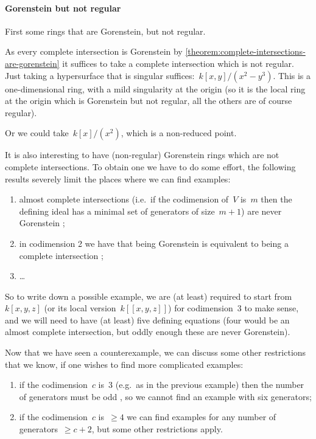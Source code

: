 \documentclass[10pt,a4paper]{article}
\begin{document}
\paragraph{Gorenstein but not regular}
First some rings that are Gorenstein, but not regular.
\begin{example}
  As every complete intersection is Gorenstein by \cref{theorem:complete-intersections-are-gorenstein} it suffices to take a complete intersection which is not regular. Just taking a hypersurface that is singular suffices:~$k[x,y]/(x^2-y^3)$. This is a one-dimensional ring, with a mild singularity at the origin (so it is the local ring at the origin which is Gorenstein but not regular, all the others are of course regular).
  
  Or we could take~$k[x]/(x^2)$, which is a non-reduced point.
\end{example}
It is also interesting to have (non-regular) Gorenstein rings which are not complete intersections. To obtain one we have to do some effort, the following results severely limit the places where we can find examples:
\begin{enumerate}
  \item almost complete intersections (i.e.\ if the codimension of~$V$ is~$m$ then the defining ideal has a minimal set of generators of size~$m+1$) are never Gorenstein \addreference;
  \item in codimension 2 we have that being Gorenstein is equivalent to being a complete intersection \cite[corollary 21.20]{eisenbud-commutative-algebra};
  \item \ldots
\end{enumerate}
So to write down a possible example, we are (at least) required to start from~$k[x,y,z]$ (or its local version~$k[[x,y,z]]$) for codimension~$3$ to make sense, and we will need to have (at least) five defining equations (four would be an almost complete intersection, but oddly enough these are never Gorenstein).
\begin{example}
  
\end{example}
Now that we have seen a counterexample, we can discuss some other restrictions that we know, if one wishes to find more complicated examples:
\begin{enumerate}
  \item if the codimension~$c$ is~3 (e.g.\ as in the previous example) then the number of generators must be odd \cite{buchsbaum-eisenbud}, so we cannot find an example with six generators;
  \item if the codimension~$c$ is~$\geq 4$ we can find examples for any number of generators~$\geq c+2$, but some other restrictions apply.
\end{enumerate}
\end{document}

